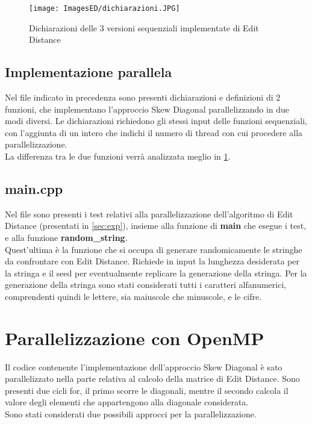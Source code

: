\documentclass[10pt,twocolumn,letterpaper]{article}
\begin{document}
\begin{figure}[h]
    \centering
    \texttt{[image: ImagesED/dichiarazioni.JPG]}
    \caption{Dichiarazioni delle 3 versioni sequenziali implementate di Edit Distance}
    \label{fig:dcl}
\end{figure}

\subsection{Implementazione parallela}
Nel file indicato in precedenza sono presenti dichiarazioni e definizioni di 2 funzioni, che implementano l'approccio Skew Diagonal parallelizzando in due modi diversi. Le dichiarazioni richiedono gli stessi input delle funzioni sequenziali, con l'aggiunta di un intero che indichi il numero di thread con cui procedere alla parallelizzazione.\\
La differenza tra le due funzioni verrà analizzata meglio in \cref{sec:par}.\\

\subsection{main.cpp}
Nel file sono presenti i test relativi alla parallelizzazione dell'algoritmo di Edit Distance (presentati in \cref{sec:exp}), insieme alla funzione di \textbf{main} che esegue i test, e alla funzione \textbf{random\_string}.\\
Quest'ultima è la funzione che si occupa di generare randomicamente le stringhe da confrontare con Edit Distance. Richiede in input la lunghezza desiderata per la stringa e il seed per eventualmente replicare la generazione della stringa. Per la generazione della stringa sono stati considerati tutti i caratteri alfanumerici, comprendenti quindi le lettere, sia maiuscole che minuscole, e le cifre.


\section{Parallelizzazione con OpenMP}
\label{sec:par}
Il codice contenente l'implementazione dell'approccio Skew Diagonal è sato parallelizzato nella parte relativa al calcolo della matrice di Edit Distance. Sono presenti due cicli for, il primo scorre le diagonali, mentre il secondo calcola il valore degli elementi che appartengono alla diagonale considerata.\\
Sono stati considerati due possibili approcci per la parallelizzazione.
\end{document}
